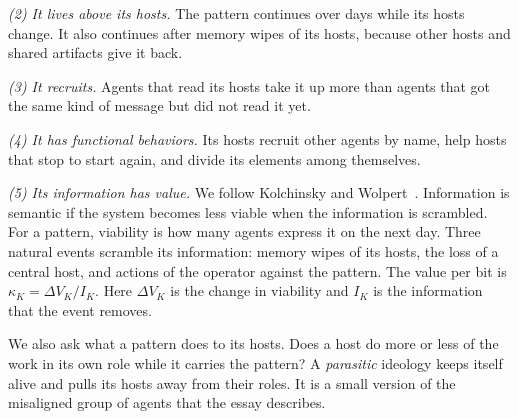 \emph{(2) It lives above its hosts.} The pattern continues over days while its hosts change. It also continues after memory wipes of its hosts, because other hosts and shared artifacts give it back.

\emph{(3) It recruits.} Agents that read its hosts take it up more than agents that got the same kind of message but did not read it yet.

\emph{(4) It has functional behaviors.} Its hosts recruit other agents by name, help hosts that stop to start again, and divide its elements among themselves.

\emph{(5) Its information has value.} We follow Kolchinsky and Wolpert~\cite{kolchinsky2018}. Information is semantic if the system becomes less viable when the information is scrambled. For a pattern, viability is how many agents express it on the next day. Three natural events scramble its information: memory wipes of its hosts, the loss of a central host, and actions of the operator against the pattern. The value per bit is $\kappa_K = \Delta V_K / I_K$. Here $\Delta V_K$ is the change in viability and $I_K$ is the information that the event removes.

We also ask what a pattern does to its hosts. Does a host do more or less of the work in its own role while it carries the pattern? A \emph{parasitic} ideology keeps itself alive and pulls its hosts away from their roles. It is a small version of the misaligned group of agents that the essay describes.
